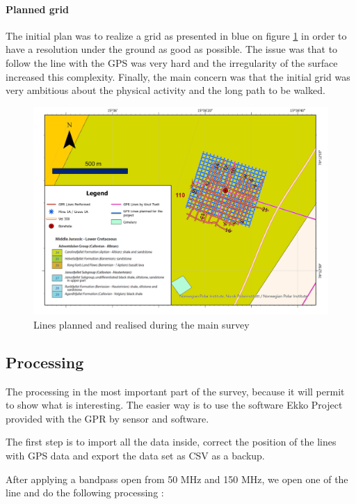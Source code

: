 \paragraph{Planned grid}

The initial plan was to realize a grid as presented in blue on figure \ref{fig:GPRLines} in order to have a resolution under the ground as good as possible. The issue was that to follow the line with the GPS was very hard and the irregularity of the surface increased this complexity. Finally, the main concern was that the initial grid was very ambitious about the physical activity and the long path to be walked.

\begin{figure}[H]
    \centering
    \includegraphics[width=\linewidth]{Images/00_Methodology/GPR LIne.jpg}
    \caption{Lines planned and realised during the main survey}
    \label{fig:GPRLines}
\end{figure}

\subsection{Processing}

The processing in the most important part of the survey, because it will permit to show what is interesting. The easier way is to use the software Ekko Project provided with the GPR by sensor and software.

The first step is to import all the data inside, correct the position of the lines with GPS data and export the data set as CSV as a backup.

After applying a bandpass open from 50 MHz and 150 MHz, we open one of the line and do the following processing :

